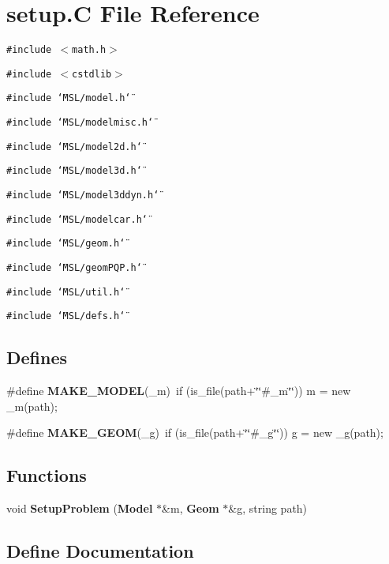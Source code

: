 \section{setup.C File Reference}
\label{setup_8C}
{\tt \#include $<$math.h$>$}\par
{\tt \#include $<$cstdlib$>$}\par
{\tt \#include \char`\"{}MSL/model.h\char`\"{}}\par
{\tt \#include \char`\"{}MSL/modelmisc.h\char`\"{}}\par
{\tt \#include \char`\"{}MSL/model2d.h\char`\"{}}\par
{\tt \#include \char`\"{}MSL/model3d.h\char`\"{}}\par
{\tt \#include \char`\"{}MSL/model3ddyn.h\char`\"{}}\par
{\tt \#include \char`\"{}MSL/modelcar.h\char`\"{}}\par
{\tt \#include \char`\"{}MSL/geom.h\char`\"{}}\par
{\tt \#include \char`\"{}MSL/geom\-PQP.h\char`\"{}}\par
{\tt \#include \char`\"{}MSL/util.h\char`\"{}}\par
{\tt \#include \char`\"{}MSL/defs.h\char`\"{}}\par
\subsection*{Defines}
\begin{CompactItemize}
\item 
\#define {\bf MAKE\_\-MODEL}(\_\-m)\ if (is\_\-file(path+\char`\"{}\char`\"{}\#\_\-m\char`\"{}\char`\"{})) m = new \_\-m(path);
\item 
\#define {\bf MAKE\_\-GEOM}(\_\-g)\ if (is\_\-file(path+\char`\"{}\char`\"{}\#\_\-g\char`\"{}\char`\"{})) g = new \_\-g(path);
\end{CompactItemize}
\subsection*{Functions}
\begin{CompactItemize}
\item 
void {\bf Setup\-Problem} ({\bf Model} $\ast$\&m, {\bf Geom} $\ast$\&g, string path)
\end{CompactItemize}


\subsection{Define Documentation}
